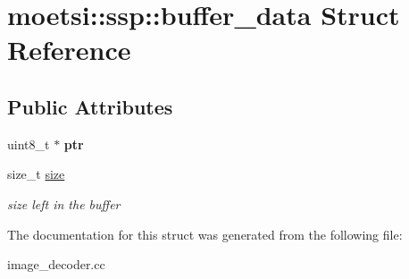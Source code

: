 \hypertarget{structmoetsi_1_1ssp_1_1buffer__data}{}\section{moetsi\+:\+:ssp\+:\+:buffer\+\_\+data Struct Reference}
\label{structmoetsi_1_1ssp_1_1buffer__data}
\subsection*{Public Attributes}
\begin{DoxyCompactItemize}
\item 
\mbox{\label{structmoetsi_1_1ssp_1_1buffer__data_a158675326710ea67b9e5eb78caefa6fc}} 
uint8\+\_\+t $\ast$ {\bfseries ptr}
\item 
\mbox{\label{structmoetsi_1_1ssp_1_1buffer__data_acd14a543f9ab4ccb7d5c9f8312861892}} 
size\+\_\+t \hyperlink{structmoetsi_1_1ssp_1_1buffer__data_acd14a543f9ab4ccb7d5c9f8312861892}{size}
\begin{DoxyCompactList}\small\item\em size left in the buffer \end{DoxyCompactList}\end{DoxyCompactItemize}


The documentation for this struct was generated from the following file\+:\begin{DoxyCompactItemize}
\item 
image\+\_\+decoder.\+cc\end{DoxyCompactItemize}
